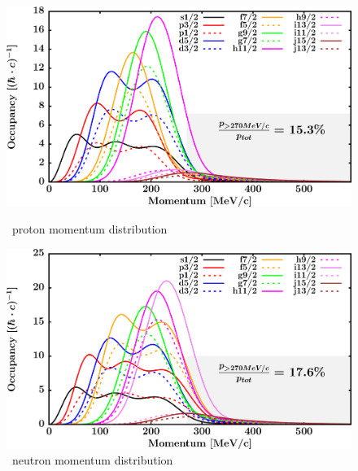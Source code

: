 \begin{figure}[hbtp]
    \centering
    \begin{minipage}{0.45\textwidth}
        \centering
        \includegraphics[width=\textwidth]{figures/pb208_protonLJMomentumDistIntegral.png}
        \caption*{\pbEight\ proton momentum distribution}
        \label{DOMFitData_pb208_proton_momentumDist}
    \end{minipage}\hspace{6pt}
    \begin{minipage}{0.45\textwidth}
        \centering
        \includegraphics[width=\textwidth]{figures/pb208_neutronLJMomentumDistIntegral.png}
        \caption*{\pbEight\ neutron momentum distribution}
        \label{DOMFitData_pb208_neutron_momentumDist}
    \end{minipage}
\end{figure}
\vspace{0.3in}
